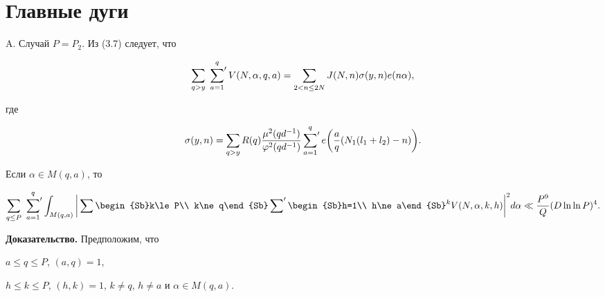 \section{Главные дуги}





A. Случай $P=P_2$. Из (3.7) следует, что


\begin{equation}


\sum_{q>y}\,\sideset{}{'}\sum_{a=1}^q V(N,\alpha,q,a)=\sum_{2<n\le 2N}


J(N,n)\sigma(y,n)e(n\alpha),


\end{equation} 


где


\begin{equation}


\sigma(y,n)=\sum_{q>y}R(q)\frac{\mu^2(qd^{-1})}{\varphi^2 (qd^{-1})}


\sideset{}{'}\sum_{a=1}^q e\bigg(\frac aq(N_1(l_1+l_2)-n)\bigg).


\end{equation}





\begin{lems}


Если $\alpha\in M(q,a)$, то


$$


\sum_{q\le P}\,\sideset{}{'}\sum_{a=1}^q\int_{M(q,a)}


\bigg|\sum\begin{Sb}k\le P\\ k\ne q\end{Sb}


\sideset{}{'}\sum\begin{Sb}h=1\\ h\ne a\end{Sb}^k


V(N,\alpha, k, h)\bigg|^2


d\alpha\ll\frac{P^9}{Q}(D\ln\ln P)^4.


$$


\end{lems}





{\bf Доказательство.} Предположим, что 


$a\le q\le P$, $(a, q)=1$,


$h\le k\le P$, $(h, k)=1$, $k\ne q$, $h\ne a$ и $\alpha\in M(q, a)$.


